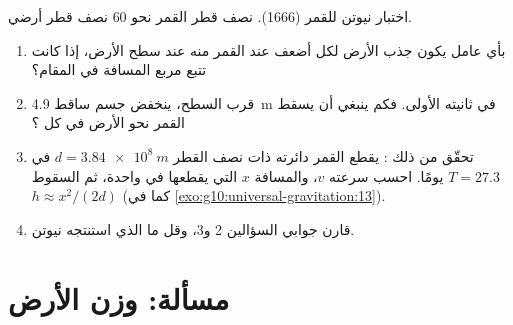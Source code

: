 \begin{exercise}[$\star\star\star$]\label{exo:g10:universal-gravitation:15}
اختبار نيوتن للقمر (1666). نصف قطر  القمر نحو $60$ نصف قطر
أرضي.
\begin{enumerate}
  \item بأي عامل يكون جذب الأرض لكل  أضعف عند
        القمر منه عند سطح الأرض، إذا كانت  تتبع
        مربع المسافة في المقام؟
  \item قرب السطح، ينخفض جسم ساقط \qty{4.9}{m} في
        ثانيته الأولى. فكم ينبغي أن يسقط القمر نحو الأرض
        في كل ؟
  \item تحقّق من ذلك : يقطع القمر دائرته ذات نصف القطر
        $d = \qty{3.84e8}{m}$ في $T = 27.3$ يومًا. احسب سرعته
        $v$، والمسافة $x$ التي يقطعها في  واحدة، ثم السقوط
        $h \approx x^2/(2d)$ (كما في
        \cref{exo:g10:universal-gravitation:13}).
  \item قارن جوابي السؤالين 2 و3، وقل ما الذي استنتجه
        نيوتن.
\end{enumerate}
\end{exercise}

\section{مسألة: وزن الأرض}


